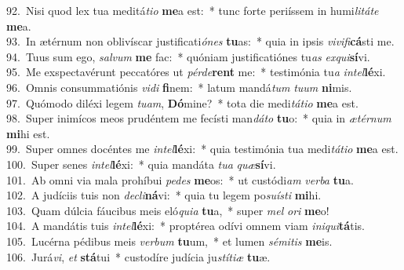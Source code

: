 {92.~}Nisi quod lex tua meditá\textit{ti}\textit{o} \textbf{me}a est:~* tunc forte periíssem in humi\textit{li}\textit{tá}\textit{te} \textbf{me}a.\\
{93.~}In ætérnum non oblivíscar justificati\textit{ó}\textit{nes} \textbf{tu}as:~* quia in ipsis \textit{vi}\textit{vi}\textit{fi}\textbf{cá}sti me.\\
{94.~}Tuus sum ego, \textit{sal}\textit{vum} \textbf{me} fac:~* quóniam justificatiónes tu\textit{as} \textit{ex}\textit{qui}\textbf{sí}vi.\\
{95.~}Me exspectavérunt peccatóres ut \textit{pér}\textit{de}\textbf{rent} me:~* testimónia tu\textit{a} \textit{in}\textit{tel}\textbf{lé}xi.\\
{96.~}Omnis consummatiónis \textit{vi}\textit{di} \textbf{fi}nem:~* latum mandá\textit{tum} \textit{tu}\textit{um} \textbf{ni}mis.\\
{97.~}Quómodo diléxi legem \textit{tu}\textit{am}, \textbf{Dó}mine?~* tota die medi\textit{tá}\textit{ti}\textit{o} \textbf{me}a est.\\
{98.~}Super inimícos meos prudéntem me fecísti man\textit{dá}\textit{to} \textbf{tu}o:~* quia in \textit{æ}\textit{tér}\textit{num} \textbf{mi}hi est.\\
{99.~}Super omnes docéntes me \textit{in}\textit{tel}\textbf{lé}xi:~* quia testimónia tua medi\textit{tá}\textit{ti}\textit{o} \textbf{me}a est.\\
{100.~}Super senes \textit{in}\textit{tel}\textbf{lé}xi:~* quia mandáta \textit{tu}\textit{a} \textit{quæ}\textbf{sí}vi.\\
{101.~}Ab omni via mala prohíbui \textit{pe}\textit{des} \textbf{me}os:~* ut custódi\textit{am} \textit{ver}\textit{ba} \textbf{tu}a.\\
{102.~}A judíciis tuis non \textit{de}\textit{cli}\textbf{ná}vi:~* quia tu legem po\textit{su}\textit{í}\textit{sti} \textbf{mi}hi.\\
{103.~}Quam dúlcia fáucibus meis eló\textit{qui}\textit{a} \textbf{tu}a,~* super \textit{mel} \textit{o}\textit{ri} \textbf{me}o!\\
{104.~}A mandátis tuis \textit{in}\textit{tel}\textbf{lé}xi:~* proptérea odívi omnem viam \textit{i}\textit{ni}\textit{qui}\textbf{tá}tis.\\
{105.~}Lucérna pédibus meis \textit{ver}\textit{bum} \textbf{tu}um,~* et lumen \textit{sé}\textit{mi}\textit{tis} \textbf{me}is.\\
{106.~}Jurá\textit{vi}, \textit{et} \textbf{stá}tui~* custodíre judícia ju\textit{stí}\textit{ti}\textit{æ} \textbf{tu}æ.\\
